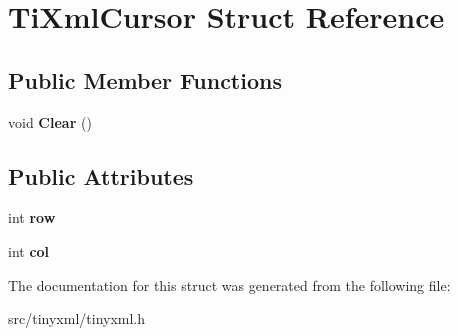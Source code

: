 \hypertarget{structTiXmlCursor}{}\section{Ti\+Xml\+Cursor Struct Reference}
\label{structTiXmlCursor}
\subsection*{Public Member Functions}
\begin{DoxyCompactItemize}
\item 
void {\bfseries Clear} ()\hypertarget{structTiXmlCursor_a1e6fa622b59dafb71b6efe595105dcdd}{}\label{structTiXmlCursor_a1e6fa622b59dafb71b6efe595105dcdd}

\end{DoxyCompactItemize}
\subsection*{Public Attributes}
\begin{DoxyCompactItemize}
\item 
int {\bfseries row}\hypertarget{structTiXmlCursor_a5b54dd949820c2db061e2be41f3effb3}{}\label{structTiXmlCursor_a5b54dd949820c2db061e2be41f3effb3}

\item 
int {\bfseries col}\hypertarget{structTiXmlCursor_a5694d7ed2c4d20109d350c14c417969d}{}\label{structTiXmlCursor_a5694d7ed2c4d20109d350c14c417969d}

\end{DoxyCompactItemize}


The documentation for this struct was generated from the following file\+:\begin{DoxyCompactItemize}
\item 
src/tinyxml/tinyxml.\+h\end{DoxyCompactItemize}
